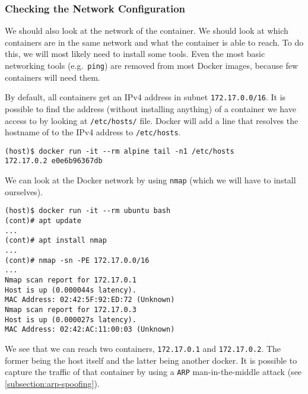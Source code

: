 \subsubsection{Checking the Network Configuration}\label{subsubsection:network-scan}
We should also look at the network of the container. We should look at which containers are in the same network and what the container is able to reach. To do this, we will most likely need to install some tools. Even the most basic networking tools (e.g.\ \lstinline{ping}) are removed from most Docker images, because few containers will need them.

By default, all containers get an IPv4 address in subnet \lstinline{172.17.0.0/16}. It is possible to find the address (without installing anything) of a container we have access to by looking at \lstinline{/etc/hosts/} file. Docker will add a line that resolves the hostname of to the IPv4 address to \lstinline{/etc/hosts}.

\begin{lstlisting}[caption={Last line of \lstinline{/etc/hosts} in Docker.},captionpos=b]
(host)$ docker run -it --rm alpine tail -n1 /etc/hosts
172.17.0.2 e0e6b96367db
\end{lstlisting}


We can look at the Docker network by using \lstinline{nmap} (which we will have to install ourselves).
\begin{lstlisting}[caption={\lstinline{nmap} scan inside container.},captionpos=b]
(host)$ docker run -it --rm ubuntu bash
(cont)# apt update
...
(cont)# apt install nmap
...
(cont)# nmap -sn -PE 172.17.0.0/16
...
Nmap scan report for 172.17.0.1
Host is up (0.000044s latency).
MAC Address: 02:42:5F:92:ED:72 (Unknown)
Nmap scan report for 172.17.0.3
Host is up (0.000027s latency).
MAC Address: 02:42:AC:11:00:03 (Unknown)
\end{lstlisting}

We see that we can reach two containers, \lstinline{172.17.0.1} and \lstinline{172.17.0.2}. The former being the host itself and the latter being another docker. It is possible to capture the traffic of that container by using a \lstinline{ARP} man-in-the-middle attack (see \autoref{subsection:arp-spoofing}).
